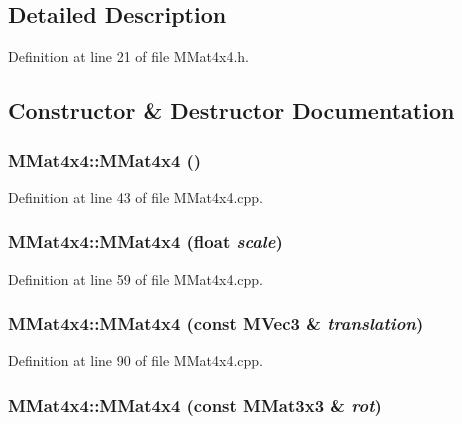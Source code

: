 \subsection{Detailed Description}


Definition at line 21 of file MMat4x4.h.

\subsection{Constructor \& Destructor Documentation}
\hypertarget{class_m_mat4x4_22ce2003a15d80e2902ffbd11bd40608}{
\subsubsection[{MMat4x4}]{\setlength{\rightskip}{0pt plus 5cm}MMat4x4::MMat4x4 ()}}
\label{class_m_mat4x4_22ce2003a15d80e2902ffbd11bd40608}




Definition at line 43 of file MMat4x4.cpp.\hypertarget{class_m_mat4x4_6365cf6fe5861ab8dbbe5505262f3883}{
\subsubsection[{MMat4x4}]{\setlength{\rightskip}{0pt plus 5cm}MMat4x4::MMat4x4 (float {\em scale})}}
\label{class_m_mat4x4_6365cf6fe5861ab8dbbe5505262f3883}




Definition at line 59 of file MMat4x4.cpp.\hypertarget{class_m_mat4x4_e9a2a999304bfaffaf1b5fa82866a234}{
\subsubsection[{MMat4x4}]{\setlength{\rightskip}{0pt plus 5cm}MMat4x4::MMat4x4 (const {\bf MVec3} \& {\em translation})}}
\label{class_m_mat4x4_e9a2a999304bfaffaf1b5fa82866a234}




Definition at line 90 of file MMat4x4.cpp.\hypertarget{class_m_mat4x4_338da41554a385f5d91fbd3e5a8f88e3}{
\subsubsection[{MMat4x4}]{\setlength{\rightskip}{0pt plus 5cm}MMat4x4::MMat4x4 (const {\bf MMat3x3} \& {\em rot})}}
\label{class_m_mat4x4_338da41554a385f5d91fbd3e5a8f88e3}




